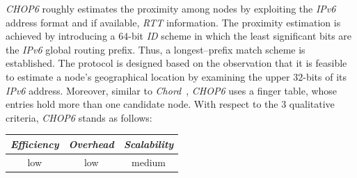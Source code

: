 \emph{CHOP6} \cite{MT2007} roughly estimates the proximity among
nodes by exploiting the {\sl IPv6} address format and if available, 
\emph{RTT} information.
The proximity estimation is achieved by introducing a $64$-bit 
\emph{ID} scheme in which
the least significant bits are the {\sl IPv6} global routing prefix.
Thus, a longest--prefix match scheme is established.
The protocol is designed based on the
observation that it is feasible to estimate a node's geographical location by
examining the upper $32$-bits of its {\sl IPv6} address. 
Moreover, similar to \emph{Chord}~\cite{stoica_chord_2001}, 
\emph{CHOP6} uses a finger table, whose entries hold
more than one candidate node.
%
%
With respect to the $3$ qualitative criteria, \emph{CHOP6} stands as follows:
\begin{center}
{\footnotesize
\begin{tabular}{ccc}
\emph{Efficiency} & \emph{Overhead} & \emph{Scalability} \\
\hline
low &
low &
medium
\end{tabular}
}
\end{center}


